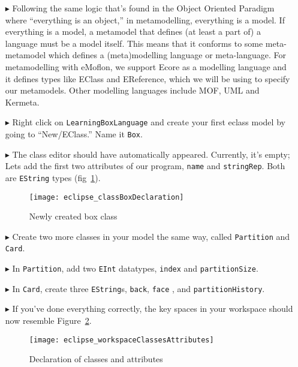 \begin{itemize}
\pagebreak

\item[$\blacktriangleright$] Following the same logic that's found in the Object Oriented Paradigm where ``everything is an object,'' in metamodelling, everything is a model. If everything is a model, a metamodel that defines (at least a part of) a language must be a model itself. This means that it conforms to some meta-metamodel which defines a (meta)modelling language or meta-language. For metamodelling with eMoflon, we support Ecore as a modelling language and it defines types like EClass and EReference, which we will be using to specify our metamodels. Other modelling languages include MOF, UML and Kermeta. %

\item[$\blacktriangleright$] Right click on \texttt{LearningBoxLanguage} and create your first eclass model by going to ``New/EClass.'' Name it \texttt{Box}.

\item[$\blacktriangleright$] The class editor should have automatically appeared. Currently, it's empty; Lets add the first two attributes of our program, \texttt{name} and \texttt{stringRep}. Both are \texttt{EString} types (fig~\ref{fig:boxDeclaration}).

\begin{figure}[htbp]
	\centering
  \texttt{[image: eclipse\_classBoxDeclaration]}
	\caption{Newly created box class}
	\label{fig:boxDeclaration}
\end{figure} 

\item[$\blacktriangleright$] Create two more classes in your model the same way, called \texttt{Partition} and \texttt{Card}. 

\item[$\blacktriangleright$] In \texttt{Partition}, add two \texttt{EInt} datatypes, \texttt{index} and \texttt{partitionSize}. 

\item[$\blacktriangleright$] In \texttt{Card}, create three \texttt{EString}s, \texttt{back}, \texttt{face} , and \texttt{partitionHistory}.

\item[$\blacktriangleright$] If you've done everything correctly, the key spaces in your workspace should now resemble Figure~\ref{fig:workspaceClassAttributes}.

\begin{figure}[htbp]
	\centering
  \texttt{[image: eclipse\_workspaceClassesAttributes]}
	\caption{Declaration of classes and attributes}
	\label{fig:workspaceClassAttributes}
\end{figure} 


\end{itemize}

